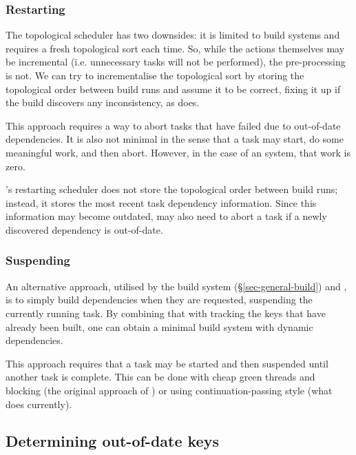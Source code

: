 \vspace{-2mm}
\subsubsection{Restarting}\label{sec-restarting}

The topological scheduler has two downsides: it is limited to 
build systems and requires a fresh topological sort each time. So, while the
actions themselves may be incremental (i.e. unnecessary tasks will not be
performed), the pre-processing is not. We can try to incrementalise the
topological sort by storing the topological order between build runs and assume
it to be correct, fixing it up if the build discovers any inconsistency, as
\Excel does.

This approach requires a way to abort tasks that have failed due to out-of-date
dependencies. It is also not minimal in the sense that a task may start, do some
meaningful work, and then abort. However, in the case of an 
system, that work is zero.

\Bazel's restarting scheduler does not store the topological order between build
runs; instead, it stores the most recent task dependency information. Since this
information may become outdated, \Bazel may also need to abort a task if a
newly discovered dependency is out-of-date.

\vspace{-2mm}
\subsubsection{Suspending}\label{sec-suspending}

An alternative approach, utilised by the  build system
(\S\ref{sec-general-build}) and \Shake, is to simply build dependencies when
they are requested, suspending the currently running task. By combining that
with tracking the keys that have already been built, one can obtain a minimal
build system with dynamic dependencies.

This approach requires that a task may be started and then suspended until
another task is complete. This can be done with cheap green threads and blocking
(the original approach of \Shake) or using continuation-passing style (what
\Shake does currently).


\subsection{Determining out-of-date keys} \label{sec-out-of-date}

